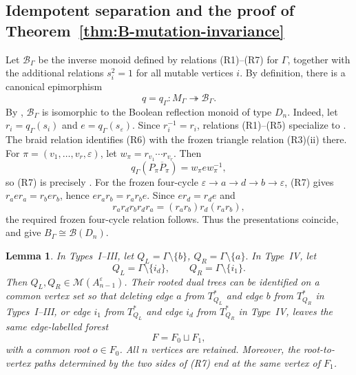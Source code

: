 \documentclass[a4paper, 12pt, reqno]{amsart}
\newtheorem{lemma}[theorem]{Lemma}
\theoremstyle{definition}
\newcommand{\Bool}{\mathcal B}
\begin{document}
\subsection{Idempotent separation and the proof of Theorem~\ref{thm:B-mutation-invariance}}

Let $\Bool_\Gamma$ be the inverse monoid defined by relations (R1)--(R7) for $\Gamma$, together with the additional relations $s_i^2=1$ for all mutable vertices $i$. By definition, there is a canonical epimorphism
\[
q = q_\Gamma:M_\Gamma\twoheadrightarrow\Bool_\Gamma.
\]
By \cite[Definition 4.5 and Theorems 4.7 and 4.9]{DLL2020}, $\Bool_\Gamma$ is isomorphic to the Boolean reflection monoid of type $D_n$. Indeed, let $r_i=q_\Gamma(s_i)$ and $e=q_\Gamma(s_\varepsilon)$. Since $r_i^{-1}=r_i$, relations (R1)--(R5) specialize to \cite[Definition 4.5, (R1), (R2), and (R3)(i)]{DLL2020}. The braid relation identifies (R6) with the frozen triangle relation (R3)(ii) there. For $\pi=(v_1,\ldots,v_r,\varepsilon)$, let $w_\pi=r_{v_1}\cdots r_{v_r}$. Then
\[
q_\Gamma(P_\pi\overline P_\pi)=w_\pi e w_\pi^{-1},
\]
so (R7) is precisely \cite[Definition 4.5, (R4)(ii)]{DLL2020}. For the frozen four-cycle $\varepsilon\to a\to d\to b\to\varepsilon$, (R7) gives $r_aer_a=r_ber_b$, hence $er_ar_b=r_ar_be$. Since $er_d=r_de$ and
\[
r_ar_dr_br_dr_a=(r_ar_b)r_d(r_ar_b),
\]
the required frozen four-cycle relation follows. Thus the presentations coincide, and \cite[Theorems 4.7 and 4.9]{DLL2020} give $B_\Gamma\cong \mathcal B(D_n)$.


\begin{lemma}\label{forest}
In Types~I--III, let $Q_L=\Gamma\setminus\{b\}$, $Q_R=\Gamma\setminus\{a\}.$  In Type~IV, let
\[
Q_L=\Gamma\setminus\{i_d\}, \qquad Q_R=\Gamma\setminus\{i_1\}.
\]
Then $Q_L,Q_R\in\mathcal M(A_{n-1}^{\varepsilon})$. Their rooted dual trees can be identified on a common vertex set so that deleting edge $a$ from $T_{Q_L}^*$ and edge $b$ from $T_{Q_R}^*$ in Types~I--III, or edge $i_1$ from $T_{Q_L}^*$ and edge $i_d$ from $T_{Q_R}^*$ in Type~IV, leaves the same edge-labelled forest
\[
F=F_0\sqcup F_1,
\]
with a common root $o\in F_0$. All $n$ vertices are retained. Moreover, the root-to-vertex paths determined by the two sides of {\rm(R7)} end at the same vertex of $F_1$.
\end{lemma}
\end{document}

